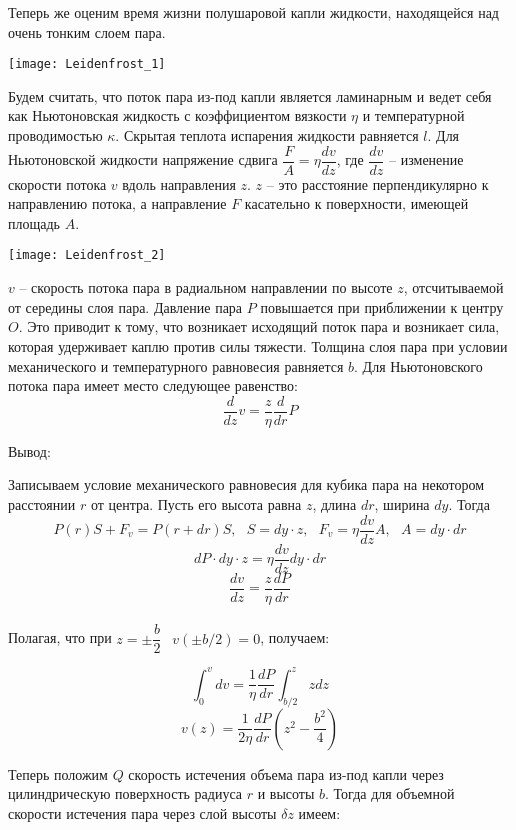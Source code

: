 \documentclass[14 pt]{extreport}
\def\cd{\cdot}
\begin{document}
	Теперь же оценим время жизни полушаровой капли жидкости, находящейся над очень тонким слоем пара.
	\begin{center}
		\texttt{[image: Leidenfrost\_1]}
	\end{center}
	
	Будем считать, что поток пара из-под капли является ламинарным и ведет себя как Ньютоновская жидкость с коэффициентом вязкости $ \eta $ и температурной проводимостью $ \kappa $. Скрытая теплота испарения жидкости равняется $ l $. Для Ньютоновской жидкости напряжение сдвига 
	$\dfrac{F}{A} = \eta \dfrac{dv}{dz}$, где $ \dfrac{dv}{dz} $ -- изменение скорости потока $ v $ вдоль направления $ z $. $ z $ -- это расстояние перпендикулярно к направлению потока, а направление $ F $ касательно к поверхности, имеющей площадь $ A $.
	
	\begin{center}
		\texttt{[image: Leidenfrost\_2]}
	\end{center}
	
	$ v $ -- скорость потока пара в радиальном направлении по высоте $ z $, отсчитываемой от середины слоя пара. Давление пара $ P $ повышается при приближении к центру $ O $. Это приводит к тому, что возникает исходящий поток пара и возникает сила, которая удерживает каплю против силы тяжести. Толщина слоя пара при условии механического и температурного равновесия равняется $ b $. Для Ньютоновского потока пара имеет место следующее равенство:
	\[\dfrac{d}{dz}v = \dfrac{z}{\eta} \dfrac{d}{dr}P\]
	
	Вывод:
	
	Записываем условие механического равновесия для кубика пара на некотором расстоянии $ r $ от центра. Пусть его высота равна $ z $, длина $ dr $, ширина $ dy $. Тогда
	\[P(r)S + F_{v} = P(r + dr)S,~~~S = dy \cd z, ~~~ F_{v} = \eta \dfrac{dv}{dz}A, ~~~ A = dy \cd dr\]
	\[dP \cd dy \cd z = \eta \dfrac{dv}{dz} dy \cd dr\]
	\[\dfrac{dv}{dz} = \dfrac{z}{\eta}\dfrac{dP}{dr}\]\\
	
	Полагая, что при $ z = \pm \dfrac{b}{2} ~~$ $ v(\pm b/2) = 0 $, получаем:
	
	\[\int_{0}^{v}dv = \dfrac{1}{\eta} \dfrac{dP}{dr} \int_{b/2}^{z}zdz\]
	\[v(z) = \dfrac{1}{2\eta} \dfrac{dP}{dr}\left( z^{2} - \dfrac{b^{2}}{4} \right) \]
	
	Теперь положим $ Q $ скорость истечения объема пара из-под капли через цилиндрическую поверхность радиуса $ r $ и высоты $ b $. Тогда для объемной скорости истечения пара через слой высоты $ \delta z $ имеем:
	
\end{document}
